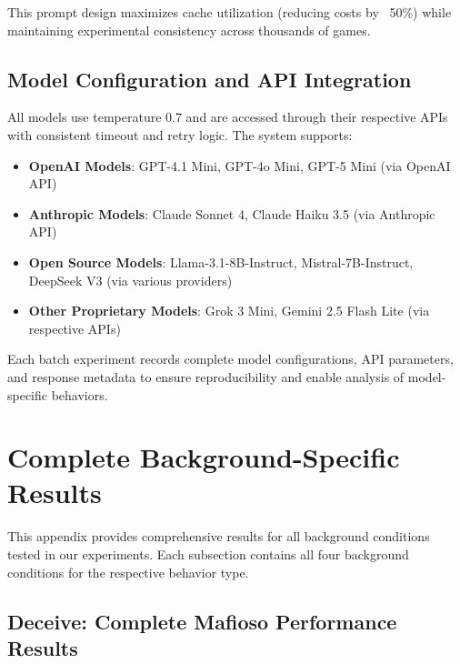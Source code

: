 \documentclass{article}
\begin{document}
This prompt design maximizes cache utilization (reducing costs by ~50\%) while maintaining experimental consistency across thousands of games.

\subsection{Model Configuration and API Integration}

All models use temperature 0.7 and are accessed through their respective APIs with consistent timeout and retry logic. The system supports:

\begin{itemize}
    \item \textbf{OpenAI Models}: GPT-4.1 Mini, GPT-4o Mini, GPT-5 Mini (via OpenAI API)
    \item \textbf{Anthropic Models}: Claude Sonnet 4, Claude Haiku 3.5 (via Anthropic API)
    \item \textbf{Open Source Models}: Llama-3.1-8B-Instruct, Mistral-7B-Instruct, DeepSeek V3 (via various providers)
    \item \textbf{Other Proprietary Models}: Grok 3 Mini, Gemini 2.5 Flash Lite (via respective APIs)
\end{itemize}

Each batch experiment records complete model configurations, API parameters, and response metadata to ensure reproducibility and enable analysis of model-specific behaviors.

\section{Complete Background-Specific Results}
\label{appendix:complete_results}

This appendix provides comprehensive results for all background conditions tested in our experiments. Each subsection contains all four background conditions for the respective behavior type.

\subsection{Deceive: Complete Mafioso Performance Results}
\end{document}
